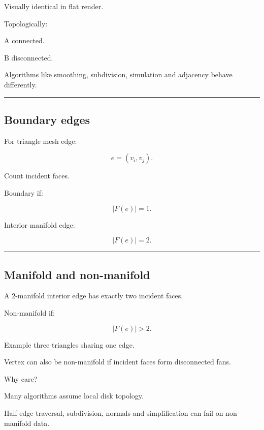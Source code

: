 Visually identical in flat render.

Topologically:

A connected.

B disconnected.

Algorithms like smoothing, subdivision, simulation and adjacency behave differently.

\begin{center}\rule{0.5\linewidth}{0.5pt}\end{center}

\subsection{Boundary edges}\label{04-visual-computing-ii-ch041-boundary-edges}

\hypertarget{04-visual-computing-ii-ch041-boundary-edges}{}

For triangle mesh edge:

\[
e=(v_i,v_j).
\]

Count incident faces.

Boundary if:

\[
\boxed{
|F(e)|=1.
}
\]

Interior manifold edge:

\[
|F(e)|=2.
\]

\begin{center}\rule{0.5\linewidth}{0.5pt}\end{center}

\subsection{Manifold and non-manifold}\label{04-visual-computing-ii-ch041-manifold-and-non-manifold}

\hypertarget{04-visual-computing-ii-ch041-manifold-and-non-manifold}{}

A 2-manifold interior edge has exactly two incident faces.

Non-manifold if:

\[
|F(e)|>2.
\]

Example three triangles sharing one edge.

Vertex can also be non-manifold if incident faces form disconnected fans.

Why care?

Many algorithms assume local disk topology.

Half-edge traversal, subdivision, normals and simplification can fail on non-manifold data.


